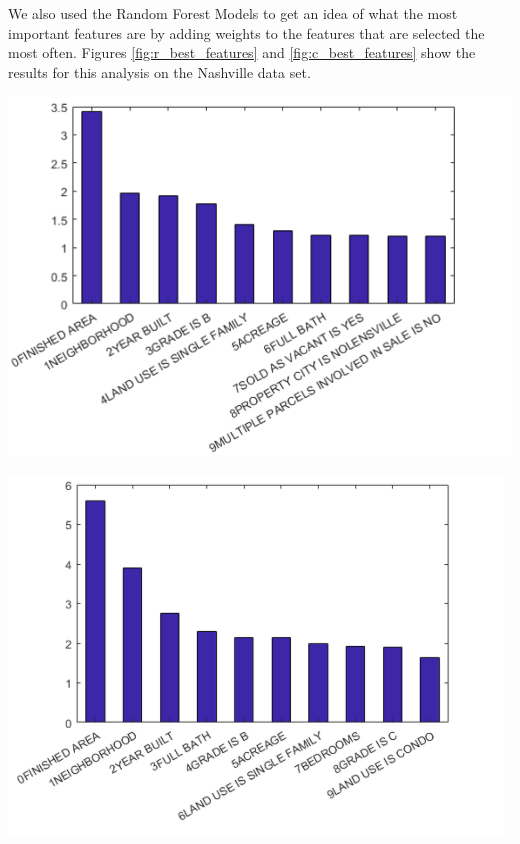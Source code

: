 \documentclass[10pt]{article}
\begin{document}
\begin{multicols}{2}
		We also used the Random Forest Models to get an idea of what the most important features are by adding weights to the features that are selected the most often. Figures \ref{fig:r_best_features} and \ref{fig:c_best_features} show the results for this analysis on the Nashville data set. 

		\begin{center}
		\captionsetup{type=figure}
			\includegraphics[scale=0.60]{Images/BestFeaturesRegression} \\
			\label{fig:r_best_features}
		\end{center}

		\begin{center}
		\captionsetup{type=figure}
			\includegraphics[scale=0.60]{Images/BestFeaturesClassification} \\
			\label{fig:c_best_features}
		\end{center}


\end{multicols}
\end{document}
